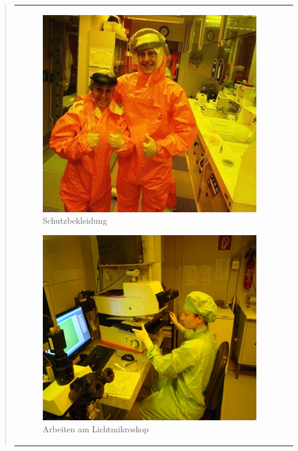 \begin{quote}
\begin{center}
\begin{tabular}{ll}
                \hspace{-14em}
                    \begin{minipage}{0.8\textwidth}
                        \begin{figure}[H]
                        \hspace{5em}
                            \includegraphics[scale=1.0, trim = 0cm 0cm 0cm
                            0cm, clip]{./HerstellungBilder/Schutzbekleidung.png}
                            \caption{Schutzbekleidung}
                           \label{fig:schutzbe}
                        \end{figure}

                    \end{minipage}
                    \begin{minipage}{0.40\textwidth}

                        \begin{figure}[H]
                        \hspace{-4em}
                            \includegraphics[scale=1.0, trim = 0cm 0cm 0cm
                            0cm, clip]
                            {./HerstellungBilder/ArbeitenamLichtmikroskop.png}
                            \caption{Arbeiten am Lichtmikroskop}
                           \label{fig:arblicht}
                        \end{figure}
                    \vspace{-1.5em}


\end{minipage}
\end{tabular}
\end{center}
\end{quote}
